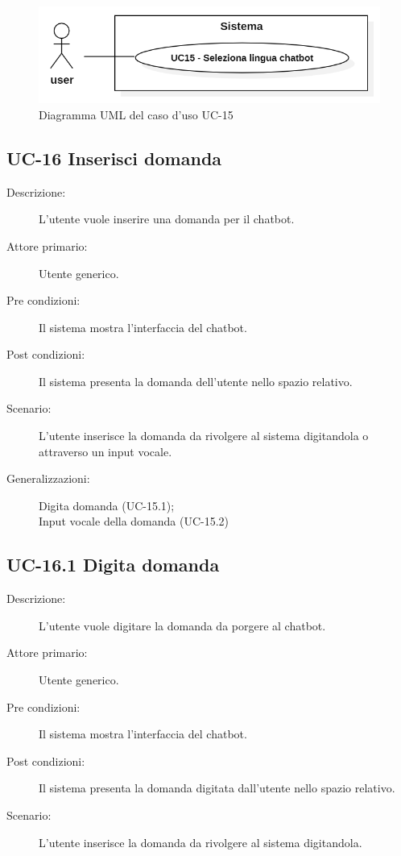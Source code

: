 \begin{figure}[H]
    \centering
    \includegraphics[width=0.8\linewidth]{UC15.png}
    \caption{Diagramma UML del caso d'uso UC-15}
    \label{fig:UC15}
\end{figure}

\subsection{UC-16 Inserisci domanda}
\begin{description}
    \item[Descrizione:] L'utente vuole inserire una domanda per il chatbot.
    \item[Attore primario:] Utente generico.
    \item[Pre condizioni:] Il sistema mostra l'interfaccia del chatbot.
    \item[Post condizioni:] Il sistema presenta la domanda dell'utente nello spazio relativo.
    \item[Scenario:] L'utente inserisce la domanda da rivolgere al sistema digitandola o attraverso un input vocale.
    \item[Generalizzazioni:] Digita domanda (UC-15.1);\\Input vocale della domanda (UC-15.2) 
\end{description}

\subsection{UC-16.1 Digita domanda}
\begin{description}
    \item[Descrizione:] L'utente vuole digitare la domanda da porgere al chatbot.
    \item[Attore primario:] Utente generico.
    \item[Pre condizioni:] Il sistema mostra l'interfaccia del chatbot.
    \item[Post condizioni:] Il sistema presenta la domanda digitata dall'utente nello spazio relativo.
    \item[Scenario:] L'utente inserisce la domanda da rivolgere al sistema digitandola.
\end{description}

